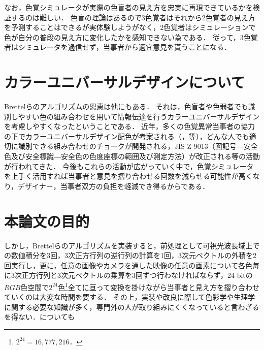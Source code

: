 \documentclass[uplatex,paper=a4,fontsize=4.0truemm,jafontsize=4.0truemm,head_space=30.0truemm,foot_space=30.0truemm,baselineskip=8.0truemm,line_length=40zw,gutter=25.0truemm,oneside,openany,fleqn,hanging_panctuation,open_bracket_pos=nibu_tentsuki,dvipdfmx,jis2004,book,titlepage]{jlreq}
\theoremstyle{mystyle}
\newcommand{\mathdisplaystyle}[1]{\(\displaystyle{#1}\)}
\begin{document}
			なお，色覚シミュレータが実際の色盲者の見え方を忠実に再現できているかを検証するのは難しい．
			色盲の理論はあるので3色覚者はそれから2色覚者の見え方を予測することはできるが実体験しようがなく，2色覚者はシミュレーションで色が自分の普段の見え方に変化したかを感知できない為である．
			従って，3色覚者はシミュレータを過信せず，当事者から適宜意見を貰うことになる．
		\section{カラーユニバーサルデザインについて}
			Brettelらのアルゴリズムの恩恵は他にもある．
			それは，色盲者や色弱者でも識別しやすい色の組み合わせを用いて情報伝達を行うカラーユニバーサルデザインを考慮しやすくなったということである．
			近年，多くの色覚異常当事者の協力の下でカラーユニバーサルデザイン配色が考案される（\cite[pp.~1091--1099]{Okabe2002c}，\cite{cudo2018}等），どんな人でも適切に識別できる組み合わせのチョークが開発される\cite{Rikagaku2020}，JIS Z 9013（図記号―安全色及び安全標識―安全色の色度座標の範囲及び測定方法）が改正される\cite{Nakano2018}等の活動が行われてきた．
			今後もこれらの活動が広がっていく中で，色覚シミュレータを上手く活用すれば当事者と意見を摺り合わせる回数を減らせる可能性が高くなり，デザイナー，当事者双方の負担を軽減でき得るからである．
		\section{本論文の目的}
			しかし，Brettelらのアルゴリズムを実装すると，前処理として可視光波長域上での数値積分を3回，3次正方行列の逆行列の計算を1回，3次元ベクトルの外積を2回実行し，更に，任意の画像やカメラを通した映像の任意の画素について各色毎に3次正方行列と3次元ベクトルの乗算を3回ずつ行わなければならず，24 bitの\mathdisplaystyle{RGB}色空間で\mathdisplaystyle{2^{24}}色\footnote{\mathdisplaystyle{2^{24}=16{,}777{,}216}．}全てに亘って変換を掛けながら当事者と見え方を摺り合わせていくのは大変な時間を要する．
			その上，実装や改良に際して色彩学や生理学に関する必要な知識が多く，専門外の人が取り組みにくくなっていると言わざるを得ない．についても
\end{document}
